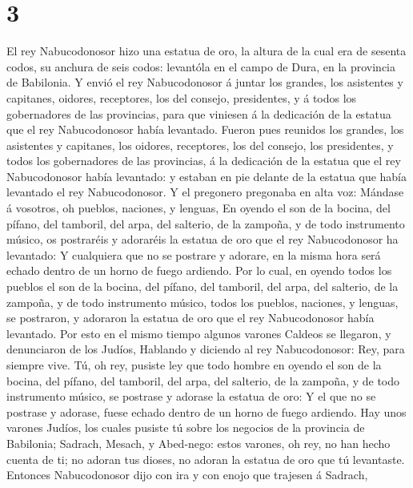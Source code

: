 \hypertarget{section-2}{%
\section{3}\label{section-2}}

 El rey Nabucodonosor hizo una estatua de oro, la altura de
la cual era de sesenta codos, su anchura de seis codos: levantóla en el
campo de Dura, en la provincia de Babilonia.  Y envió el rey
Nabucodonosor á juntar los grandes, los asistentes y capitanes, oidores,
receptores, los del consejo, presidentes, y á todos los gobernadores de
las provincias, para que viniesen á la dedicación de la estatua que el
rey Nabucodonosor había levantado.  Fueron pues reunidos los
grandes, los asistentes y capitanes, los oidores, receptores, los del
consejo, los presidentes, y todos los gobernadores de las provincias, á
la dedicación de la estatua que el rey Nabucodonosor había levantado: y
estaban en pie delante de la estatua que había levantado el rey
Nabucodonosor.  Y el pregonero pregonaba en alta voz:
Mándase á vosotros, oh pueblos, naciones, y lenguas,  En
oyendo el son de la bocina, del pífano, del tamboril, del arpa, del
salterio, de la zampoña, y de todo instrumento músico, os postraréis y
adoraréis la estatua de oro que el rey Nabucodonosor ha levantado:
 Y cualquiera que no se postrare y adorare, en la misma hora
será echado dentro de un horno de fuego ardiendo.  Por lo
cual, en oyendo todos los pueblos el son de la bocina, del pífano, del
tamboril, del arpa, del salterio, de la zampoña, y de todo instrumento
músico, todos los pueblos, naciones, y lenguas, se postraron, y adoraron
la estatua de oro que el rey Nabucodonosor había levantado. 
Por esto en el mismo tiempo algunos varones Caldeos se llegaron, y
denunciaron de los Judíos,  Hablando y diciendo al rey
Nabucodonosor: Rey, para siempre vive.  Tú, oh rey, pusiste
ley que todo hombre en oyendo el son de la bocina, del pífano, del
tamboril, del arpa, del salterio, de la zampoña, y de todo instrumento
músico, se postrase y adorase la estatua de oro:  Y el que
no se postrase y adorase, fuese echado dentro de un horno de fuego
ardiendo.  Hay unos varones Judíos, los cuales pusiste tú
sobre los negocios de la provincia de Babilonia; Sadrach, Mesach, y
Abed-nego: estos varones, oh rey, no han hecho cuenta de ti; no adoran
tus dioses, no adoran la estatua de oro que tú levantaste. 
Entonces Nabucodonosor dijo con ira y con enojo que trajesen á Sadrach,

